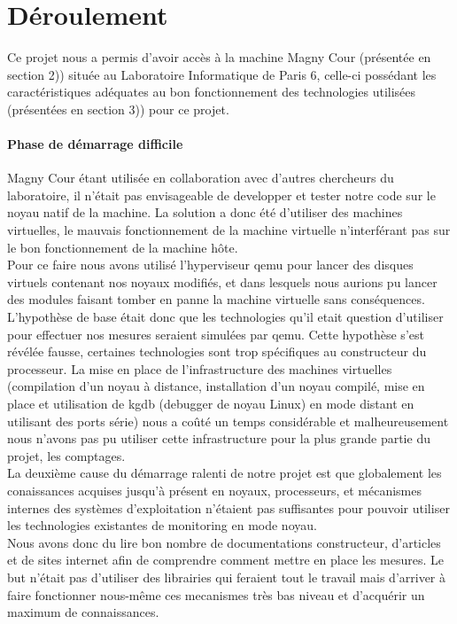   \section{Déroulement}
    Ce projet nous a permis d'avoir accès à la machine Magny Cour (présentée en
    section 2)) située au Laboratoire Informatique de Paris 6, celle-ci
    possédant les caractéristiques adéquates au bon fonctionnement des
    technologies utilisées (présentées en section 3)) pour ce projet.
  
    \paragraph{Phase de démarrage difficile}
      Magny Cour étant utilisée en collaboration avec d'autres chercheurs du
      laboratoire, il n'était pas envisageable de developper et tester notre
      code sur le noyau natif de la machine. La solution a donc été d'utiliser
      des machines virtuelles, le mauvais fonctionnement de la machine virtuelle
      n'interférant pas sur le bon fonctionnement de la machine hôte.\\ Pour ce
      faire nous avons utilisé l'hyperviseur qemu pour lancer des disques
      virtuels contenant nos noyaux modifiés, et dans lesquels nous aurions pu
      lancer des modules faisant tomber en panne la machine virtuelle sans
      conséquences. L'hypothèse de base était donc que les technologies qu'il
      etait question d'utiliser pour effectuer nos mesures seraient simulées par
      qemu. Cette hypothèse s'est révélée fausse, certaines technologies sont
      trop spécifiques au constructeur du processeur. La mise en place de
      l'infrastructure des machines virtuelles (compilation d'un noyau à
      distance, installation d'un noyau compilé, mise en place et utilisation de
      kgdb (debugger de noyau Linux) en mode distant en utilisant des ports
      série) nous a coûté un temps considérable et malheureusement nous n'avons
      pas pu utiliser cette infrastructure pour la plus grande partie du projet,
      les comptages.\\ La deuxième cause du démarrage ralenti de notre projet
      est que globalement les conaissances acquises jusqu'à présent en noyaux,
      processeurs, et mécanismes internes des systèmes d'exploitation n'étaient
      pas suffisantes pour pouvoir utiliser les technologies existantes de
      monitoring en mode noyau.\\ Nous avons donc du lire bon nombre de
      documentations constructeur, d'articles et de sites internet afin de
      comprendre comment mettre en place les mesures. Le but n'était pas
      d'utiliser des librairies qui feraient tout le travail mais d'arriver à
      faire fonctionner nous-même ces mecanismes très bas niveau et d'acquérir
      un maximum de connaissances.


